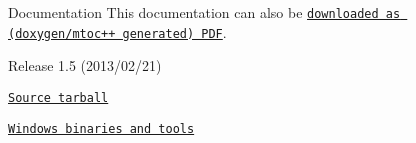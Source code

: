 \begin{DoxyParagraph}{Documentation}
This documentation can also be \href{http://www.morepas.org/software/mtocpp/docs/manual.pdf}{\tt downloaded as (doxygen/mtoc++ generated) P\+D\+F}.
\end{DoxyParagraph}
\begin{DoxyParagraph}{Release 1.5 (2013/02/21)}

\begin{DoxyItemize}
\item \href{http://www.morepas.org/software/mtocpp/mtoc++_src_1.5.tar.gz}{\tt Source tarball}
\item \href{http://www.morepas.org/software/mtocpp/mtoc++_win_1.5.zip}{\tt Windows binaries and tools} 
\end{DoxyItemize}
\end{DoxyParagraph}
